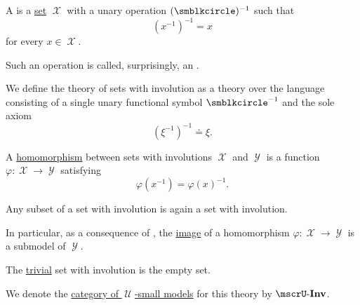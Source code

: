 \begin{definition}\label{def:set_with_involution}\mimprovised
  A  is a \hyperref[def:set]{set} \( \mscrX \) with a unary operation \( (\anon)^{-1} \) such that
  \begin{equation*}
    (x^{-1})^{-1} = x
  \end{equation*}
  for every \( x \in \mscrX \).

  Such an operation is called, surprisingly, an .

  \begin{thmenum}
     We define the theory of sets with involution as a theory over the language consisting of a single unary functional symbol \( \anon^{-1} \) and the sole axiom
    \begin{equation}\label{eq:def:set_with_involution/theory/axiom}
      (\xi^{-1})^{-1} \doteq \xi.
    \end{equation}

     A \hyperref[def:first_order_homomorphism]{homomorphism} between sets with involutions \( \mscrX \) and \( \mscrY \) is a function \( \varphi: \mscrX \to \mscrY \) satisfying
    \begin{equation}\label{eq:def:set_with_involution/homomorphism}
      \varphi(x^{-1})
      =
      \varphi(x)^{-1}.
    \end{equation}

     Any subset of a set with involution is again a set with involution.

    In particular, as a consequence of , the \hyperref[def:multi_valued_function/image]{image} of a homomorphism \( \varphi: \mscrX \to \mscrY \) is a submodel of \( \mscrY \).

     The \hyperref[thm:substructures_form_complete_lattice/bottom]{trivial} set with involution is the empty set.

     We denote the \hyperref[def:category_of_small_first_order_models]{category of \( \mscrU \)-small models} for this theory by \( \ucat{Inv} \).
  \end{thmenum}
\end{definition}

